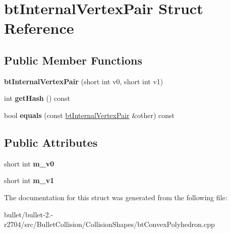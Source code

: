 \hypertarget{structbt_internal_vertex_pair}{\section{bt\+Internal\+Vertex\+Pair Struct Reference}
\label{structbt_internal_vertex_pair}
}
\subsection*{Public Member Functions}
\begin{DoxyCompactItemize}
\item 
\hypertarget{structbt_internal_vertex_pair_aae7c609e90ba34c17905dcf3ab90052b}{{\bfseries bt\+Internal\+Vertex\+Pair} (short int v0, short int v1)}\label{structbt_internal_vertex_pair_aae7c609e90ba34c17905dcf3ab90052b}

\item 
\hypertarget{structbt_internal_vertex_pair_ac0f893e1df4482aca88de9c420a1ede7}{int {\bfseries get\+Hash} () const }\label{structbt_internal_vertex_pair_ac0f893e1df4482aca88de9c420a1ede7}

\item 
\hypertarget{structbt_internal_vertex_pair_a115166e5f91008b5dc9f6ebd217d7a60}{bool {\bfseries equals} (const \hyperlink{structbt_internal_vertex_pair}{bt\+Internal\+Vertex\+Pair} \&other) const }\label{structbt_internal_vertex_pair_a115166e5f91008b5dc9f6ebd217d7a60}

\end{DoxyCompactItemize}
\subsection*{Public Attributes}
\begin{DoxyCompactItemize}
\item 
\hypertarget{structbt_internal_vertex_pair_a5655e4633f313baff90aaa9ed7aa5048}{short int {\bfseries m\+\_\+v0}}\label{structbt_internal_vertex_pair_a5655e4633f313baff90aaa9ed7aa5048}

\item 
\hypertarget{structbt_internal_vertex_pair_a150a2e6ec8ccaf70b4d004d8c12529d7}{short int {\bfseries m\+\_\+v1}}\label{structbt_internal_vertex_pair_a150a2e6ec8ccaf70b4d004d8c12529d7}

\end{DoxyCompactItemize}


The documentation for this struct was generated from the following file\+:\begin{DoxyCompactItemize}
\item 
bullet/bullet-\/2.-\/r2704/src/\+Bullet\+Collision/\+Collision\+Shapes/bt\+Convex\+Polyhedron.\+cpp\end{DoxyCompactItemize}
